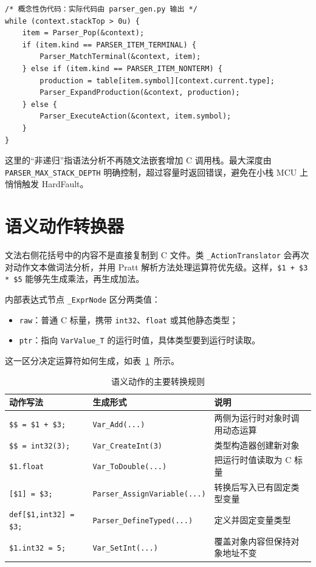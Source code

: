 \begin{lstlisting}[style=c]
/* 概念性伪代码：实际代码由 parser_gen.py 输出 */
while (context.stackTop > 0u) {
    item = Parser_Pop(&context);
    if (item.kind == PARSER_ITEM_TERMINAL) {
        Parser_MatchTerminal(&context, item);
    } else if (item.kind == PARSER_ITEM_NONTERM) {
        production = table[item.symbol][context.current.type];
        Parser_ExpandProduction(&context, production);
    } else {
        Parser_ExecuteAction(&context, item.symbol);
    }
}
\end{lstlisting}

这里的“非递归”指语法分析不再随文法嵌套增加 C 调用栈。最大深度由 \texttt{PARSER\_MAX\_STACK\_DEPTH} 明确控制，超过容量时返回错误，避免在小栈 MCU 上悄悄触发 HardFault。
\section{语义动作转换器}

文法右侧花括号中的内容不是直接复制到 C 文件。类 \texttt{\_ActionTranslator} 会再次对动作文本做词法分析，并用 Pratt 解析方法处理运算符优先级。这样，\texttt{\$1 + \$3 * \$5} 能够先生成乘法，再生成加法。

内部表达式节点 \texttt{\_ExprNode} 区分两类值：

\begin{itemize}
\item \texttt{raw}：普通 C 标量，携带 \texttt{int32}、\texttt{float} 或其他静态类型；
\item \texttt{ptr}：指向 \texttt{VarValue\_T} 的运行时值，具体类型要到运行时读取。
\end{itemize}

这一区分决定运算符如何生成，如表~\ref{tab:app-action-map}~所示。

\begin{table}[htbp]
\centering
\caption{语义动作的主要转换规则} \label{tab:app-action-map}
\begin{tabularx}{\textwidth}{llX}
\toprule
动作写法 & 生成形式 & 说明 \\
\midrule
\texttt{\$\$ = \$1 + \$3;} & \texttt{Var\_Add(...)} & 两侧为运行时对象时调用动态运算 \\
\texttt{\$\$ = int32(3);} & \texttt{Var\_CreateInt(3)} & 类型构造器创建新对象 \\
\texttt{\$1.float} & \texttt{Var\_ToDouble(...)} & 把运行时值读取为 C 标量 \\
\texttt{[\$1] = \$3;} & \texttt{Parser\_AssignVariable(...)} & 转换后写入已有固定类型变量 \\
\texttt{def[\$1,int32] = \$3;} & \texttt{Parser\_DefineTyped(...)} & 定义并固定变量类型 \\
\texttt{\$1.int32 = 5;} & \texttt{Var\_SetInt(...)} & 覆盖对象内容但保持对象地址不变 \\
\bottomrule
\end{tabularx}
\end{table}

